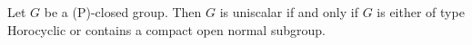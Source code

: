 \documentclass[preview]{standalone}
\begin{document}
\begin{center}
Let $G$ be a (P)-closed group. Then $G$ is uniscalar if and only if $G$ is either of type Horocyclic or contains a compact open normal subgroup.
\end{center}
\end{document}
